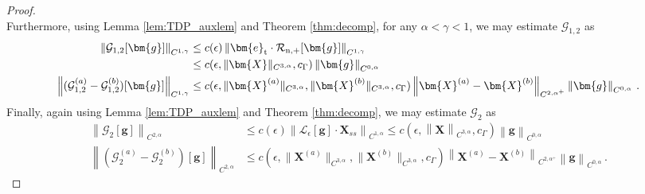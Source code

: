 \documentclass[11pt,reqno]{amsart}
\newcommand{\X}{\bm{X}}
\newcommand{\be}{\bm{e}}
\newcommand{\norm}[1]{\left\lVert #1 \right\rVert}
\newcommand{\mc}[1]{\mathcal{#1}}
\theoremstyle{definition}
\begin{document}
\begin{proof}
\begin{equation}
\end{equation}
%
%
%
Furthermore, using Lemma \ref{lem:TDP_auxlem} and Theorem \ref{thm:decomp}, for any $\alpha<\gamma<1$, we may estimate $\mc{G}_{1,2}$ as
\begin{equation}
\begin{aligned}
  \norm{\mc{G}_{1,2}[\bm{g}]}_{C^{1,\gamma}} &\le c(\epsilon)\norm{\be_{\rm t}\cdot\mc{R}_{\rm n,+}[\bm{g}]}_{C^{1,\gamma}} \\
  &\le c(\epsilon,\|\X\|_{C^{3,\alpha}},c_\Gamma)\norm{\bm{g}}_{C^{0,\alpha}}\\
  \norm{(\mc{G}_{1,2}^{(a)}-\mc{G}_{1,2}^{(b)})[\bm{g}]}_{C^{1,\gamma}} &\le
  c(\epsilon,\|\X^{(a)}\|_{C^{3,\alpha}},\|\X^{(b)}\|_{C^{3,\alpha}},c_\Gamma)\norm{\X^{(a)}-\X^{(b)}}_{C^{2,\alpha^+}}\norm{\bm{g}}_{C^{0,\alpha}}\,.
\end{aligned}
\end{equation}
%
%
%
Finally, again using Lemma \ref{lem:TDP_auxlem} and Theorem \ref{thm:decomp}, we may estimate $\mc{G}_2$ as 
\begin{equation}
\begin{aligned}
  \norm{\mc{G}_2[\bm{g}]}_{C^{2,\alpha}} &\le c(\epsilon)\norm{\mc{L}_\epsilon[\bm{g}]\cdot\X_{ss}}_{C^{1,\alpha}}
  \le c(\epsilon,\norm{\X}_{C^{3,\alpha}},c_\Gamma)\norm{\bm{g}}_{C^{0,\alpha}} \\
  \norm{(\mc{G}_2^{(a)}-\mc{G}_2^{(b)})[\bm{g}]}_{C^{2,\alpha}} &\le 
  c(\epsilon,\|\X^{(a)}\|_{C^{3,\alpha}},\|\X^{(b)}\|_{C^{3,\alpha}},c_\Gamma)\norm{\X^{(a)}-\X^{(b)}}_{C^{2,\alpha^+}}\norm{\bm{g}}_{C^{0,\alpha}}\,.
\end{aligned}
\end{equation}




\end{proof}
\end{document}
